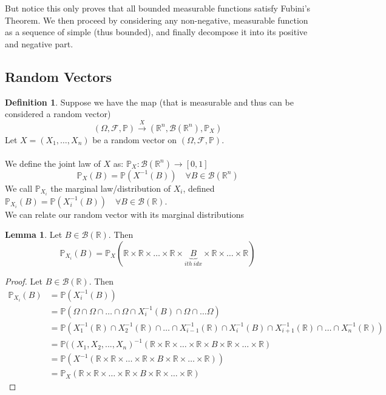 \documentclass[11pt,a4paper]{article}
\theoremstyle{definition}
\newtheorem{definition}{Definition}[section]
\newtheorem{lemma}{Lemma}[section]
\begin{document}
But notice this only proves that all bounded measurable functions satisfy Fubini's Theorem. We then proceed by considering any non-negative, measurable function as a sequence of simple (thus bounded), and finally decompose it into its positive and negative part.
\subsection{Random Vectors}

\begin{definition} Suppose we have the map (that is measurable and thus can be considered a random vector)
\[
(\Omega, \mathcal{F}, \mathbb{P}) \xrightarrow{X} (\mathbb{R}^n, \mathcal{B}(\mathbb{R}^n), \mathbb{P}_X)
\]
Let $X = (X_1, \ldots, X_n)$ be a random vector on $(\Omega, \mathcal{F}, \mathbb{P})$.
~\\~\\
We define the joint law of $X$ as: $\mathbb{P}_X: \mathcal{B}(\mathbb{R}^n) \longrightarrow [0,1]$
$$\mathbb{P}_X(B) = \mathbb{P}(X^{-1}(B)) \quad \forall B \in \mathcal{B}(\mathbb{R}^n)$$
We call $\mathbb{P}_{X_i}$ the marginal law/distribution of $X_i$, defined $\mathbb{P}_{X_i}(B) = \mathbb{P}(X_i^{-1}(B)) \quad \forall B \in \mathcal{B}(\mathbb{R})$. \\ We can relate our random vector with its marginal distributions
\end{definition}

\begin{lemma} Let $B \in \mathcal{B}(\mathbb{R})$. Then
\[
\mathbb{P}_{X_i}(B) = \mathbb{P}_X(\mathbb{R} \times \mathbb{R} \times \dots \times \mathbb{R} \times \underbrace{B}_{ith  \ idx}\times \mathbb{R} \times \dots \times \mathbb{R})
\]

\end{lemma}

\begin{proof} Let $B \in \mathcal{B}(\mathbb{R})$. Then
\begin{align*}
    \mathbb{P}_{X_i}(B) & = \mathbb{P}(X_i^{-1}(B)) \\ & = \mathbb{P}(\Omega \cap \Omega \cap \dots \cap \Omega \cap X_i^{-1}(B) \cap \Omega \cap \dots \Omega) \\ &= \mathbb{P}(X_1^{-1}(\mathbb{R}) \cap X_2^{-1}(\mathbb{R}) \cap \dots \cap X_{i-1}^{-1}(\mathbb{R}) \cap X_i^{-1}(B) \cap X_{i+1}^{-1}(\mathbb{R}) \cap \dots \cap X_n^{-1}(\mathbb{R}))
    \\ & = \mathbb{P}((X_1, X_2, ..., X_n)^{-1}(\mathbb{R} \times \mathbb{R} \times \dots \times \mathbb{R} \times B
    \times \mathbb{R} \times \dots \times \mathbb{R}) \\ & = \mathbb{P}(X^{-1}(\mathbb{R} \times \mathbb{R} \times \dots \times \mathbb{R} \times B
    \times \mathbb{R} \times \dots \times \mathbb{R})) \\ &= \mathbb{P}_X(\mathbb{R} \times \mathbb{R} \times \dots \times \mathbb{R} \times B
    \times \mathbb{R} \times \dots \times \mathbb{R})
\end{align*}
    
\end{proof}
\end{document}
